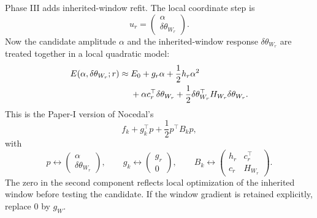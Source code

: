 \documentclass[10pt,twocolumn]{article}
\begin{document}
Phase III adds inherited-window refit. The local coordinate step is
\begin{equation}
u_r=
\begin{pmatrix}
\alpha\\
\delta\theta_{W_r}
\end{pmatrix}.
\label{eq:u_r_block}
\end{equation}
Now the candidate amplitude \(\alpha\) and the inherited-window response \(\delta\theta_{W_r}\) are treated together in a local quadratic model:
\begin{align}
E(\alpha,\delta\theta_{W_r};r)
\approx{}&E_0+g_r\alpha+\frac12h_r\alpha^2
\notag\\
&+\alpha c_r^\top\delta\theta_{W_r}
+\frac12\delta\theta_{W_r}^\top H_{W_r}\delta\theta_{W_r}.
\label{eq:paper_phase3_model}
\end{align}
This is the Paper-I version of Nocedal's
\begin{equation}
f_k+g_k^\top p+\frac12p^\top B_kp,
\label{eq:nocedal_reference_again}
\end{equation}
with
\begin{equation}
p\leftrightarrow
\begin{pmatrix}
\alpha\\
\delta\theta_{W_r}
\end{pmatrix},
\qquad
g_k\leftrightarrow
\begin{pmatrix}
g_r\\
0
\end{pmatrix},
\qquad
B_k\leftrightarrow
\begin{pmatrix}
h_r&c_r^\top\\
c_r&H_{W_r}
\end{pmatrix}.
\label{eq:block_dictionary}
\end{equation}
The zero in the second component reflects local optimization of the inherited window before testing the candidate. If the window gradient is retained explicitly, replace \(0\) by \(g_W\).
\end{document}
